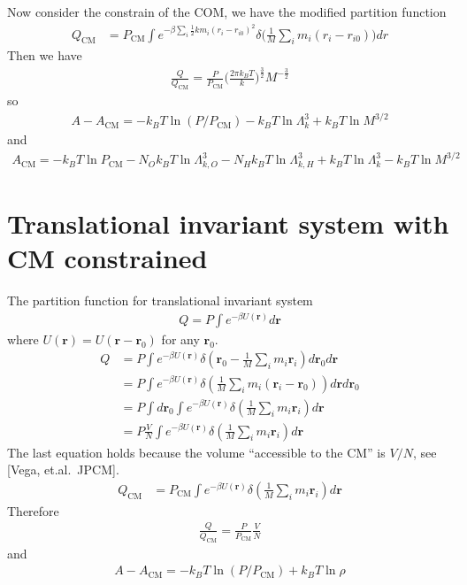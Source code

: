 \documentclass[aps,pre,a4paper,showkeys,fleqn]{revtex4}
\newcommand{\com}[0]{{\textrm{CM}}}
\begin{document}
Now consider the constrain of the COM, we have the modified partition function
\begin{align*}
  Q_\com
  &=
    {P_\com}
    \int e^{-\beta\sum_i \frac 12km_i(r_i - r_{i0})^2} \delta\big(\frac1M\sum_i m_i(r_i -  r_{i0})\big) dr
\end{align*}
Then we have
\begin{align}
  \frac{Q}{Q_\com} = \frac{P}{P_\com}\Big( \frac{2\pi k_BT}k  \Big)^{\frac32} M^{-\frac32}
\end{align}
so
\begin{align}
  A - A_\com = -k_BT \ln(P/P_\com) - k_BT \ln \Lambda_k^3 + k_BT \ln M^{3/2}
\end{align}
and
\begin{align}\label{eqn:10}
  A_\com =
  -k_BT \ln P_\com
  - N_O k_BT \ln \Lambda_{k,O}^3
  - N_H k_BT \ln \Lambda_{k,H}^3
  + k_BT\ln \Lambda_k^3 - k_BT \ln M^{3/2}
\end{align}



\section{Translational invariant system with CM constrained}
The partition function for translational invariant system
\begin{align*}
  Q = P \int e^{-\beta U(\bm r)}d \bm r
\end{align*}
where $U(\bm r) = U(\bm r - \bm r_0)$ for any $\bm r_0$.
\begin{align*}
  Q
  &=
    P \int e^{-\beta U(\bm r)} \delta(\bm r_0 - \frac1M\sum_i m_i \bm r_i) d\bm r_0 d\bm r \\
  &=
    P \int e^{-\beta U(\bm r)} \delta(\frac1M\sum_i m_i (\bm r_i - \bm r_0)) d\bm r d\bm r_0 \\
  &=
    P\int d\bm r_0 \int e^{-\beta U(\bm r)} \delta(\frac1M\sum_i m_i \bm r_i) d\bm r\\
  &=
    P\frac{V}{N} \int e^{-\beta U(\bm r)} \delta(\frac1M\sum_i m_i \bm r_i) d\bm r
\end{align*}
The last equation holds because the volume ``accessible to the CM'' is $V/N$, see [Vega, et.al.~JPCM].
\begin{align*}
  Q_\com
  &=
    P_\com\int e^{-\beta U(\bm r)} \delta(\frac1M\sum_i m_i \bm r_i) d\bm r
\end{align*}
Therefore
\begin{align*}
  \frac{Q}{Q_\com} = \frac{P}{P_\com}\frac{V}{N}
\end{align*}
and
\begin{align}
  A - A_\com = -k_BT\ln(P / P_\com) + k_BT\ln \rho
\end{align}
\end{document}
